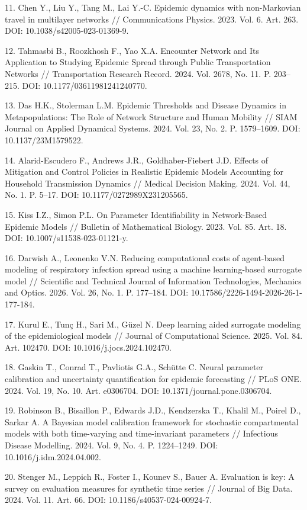 \documentclass[12pt,a4paper,twocolumn]{article}
\begin{document}
\begin{small}
11. Chen Y., Liu Y., Tang M., Lai Y.-C. Epidemic dynamics with non-Markovian travel in multilayer networks // Communications Physics. 2023. Vol. 6. Art. 263. DOI: 10.1038/s42005-023-01369-9.

12. Tahmasbi B., Roozkhosh F., Yao X.A. Encounter Network and Its Application to Studying Epidemic Spread through Public Transportation Networks // Transportation Research Record. 2024. Vol. 2678, No. 11. P. 203–215. DOI: 10.1177/03611981241240770.

13. Das H.K., Stolerman L.M. Epidemic Thresholds and Disease Dynamics in Metapopulations: The Role of Network Structure and Human Mobility // SIAM Journal on Applied Dynamical Systems. 2024. Vol. 23, No. 2. P. 1579–1609. DOI: 10.1137/23M1579522.

14. Alarid-Escudero F., Andrews J.R., Goldhaber-Fiebert J.D. Effects of Mitigation and Control Policies in Realistic Epidemic Models Accounting for Household Transmission Dynamics // Medical Decision Making. 2024. Vol. 44, No. 1. P. 5–17. DOI: 10.1177/0272989X231205565.

15. Kiss I.Z., Simon P.L. On Parameter Identifiability in Network-Based Epidemic Models // Bulletin of Mathematical Biology. 2023. Vol. 85. Art. 18. DOI: 10.1007/s11538-023-01121-y.

16. Darwish A., Leonenko V.N. Reducing computational costs of agent-based modeling of respiratory infection spread using a machine learning-based surrogate model // Scientific and Technical Journal of Information Technologies, Mechanics and Optics. 2026. Vol. 26, No. 1. P. 177–184. DOI: 10.17586/2226-1494-2026-26-1-177-184.

17. Kurul E., Tunç H., Sari M., Güzel N. Deep learning aided surrogate modeling of the epidemiological models // Journal of Computational Science. 2025. Vol. 84. Art. 102470. DOI: 10.1016/j.jocs.2024.102470.

18. Gaskin T., Conrad T., Pavliotis G.A., Schütte C. Neural parameter calibration and uncertainty quantification for epidemic forecasting // PLoS ONE. 2024. Vol. 19, No. 10. Art. e0306704. DOI: 10.1371/journal.pone.0306704.

19. Robinson B., Bisaillon P., Edwards J.D., Kendzerska T., Khalil M., Poirel D., Sarkar A. A Bayesian model calibration framework for stochastic compartmental models with both time-varying and time-invariant parameters // Infectious Disease Modelling. 2024. Vol. 9, No. 4. P. 1224–1249. DOI: 10.1016/j.idm.2024.04.002.

20. Stenger M., Leppich R., Foster I., Kounev S., Bauer A. Evaluation is key: A survey on evaluation measures for synthetic time series // Journal of Big Data. 2024. Vol. 11. Art. 66. DOI: 10.1186/s40537-024-00924-7.


\end{small}
\end{document}
